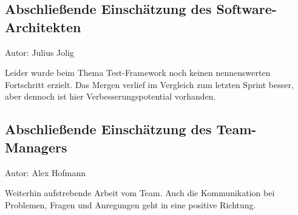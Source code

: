 \subsection{Abschließende Einschätzung des Software-Architekten}
{\small Autor: Julius Jolig}

Leider wurde beim Thema Test-Framework noch keinen nennenswerten Fortschritt erzielt. Das Mergen verlief im Vergleich zum letzten Sprint besser, aber dennoch ist hier Verbesserungspotential vorhanden.


\subsection{Abschließende Einschätzung des Team-Managers}
{\small Autor: Alex Hofmann}

Weiterhin aufstrebende Arbeit vom Team. Auch die Kommunikation bei Problemen, Fragen und Anregungen geht in eine positive Richtung.

